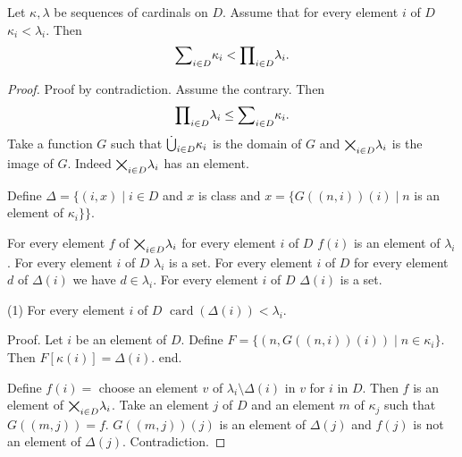 \documentclass{article}
\newcommand{\val}[2]{#1_{#2}}
\newcommand{\card}[1]{\operatorname{card}(#1)}
\begin{document}
\begin{forthel}
    \begin{theorem}
      Let $\kappa, \lambda$ be sequences of cardinals on $D$.
     Assume that for every element $i$ of $D$
     $\val{\kappa}{i} < \val{\lambda}{i}$.
     Then $$\Sum{\kappa}{D} < \Prod{\lambda}{D}.$$
    \end{theorem}
    \begin{proof}
      Proof by contradiction. Assume the contrary.
      Then $$\Prod{\lambda}{D} \leq \Sum{\kappa}{D}.$$
      Take a function $G$ such that $\SumSet{\kappa}{D}$ is the domain of $G$
      and $\ProdSet{\lambda}{D}$ is the image of $G$.
      Indeed $\ProdSet{\lambda}{D}$ has an element.

      Define $\Delta = \{ (i, x) \mid i \in D$ and $x$ is class and
        $x = \{ G((n,i))(i) \mid n$ is an element of $\val{\kappa}{i}\} \}$.

      For every element $f$ of $\ProdSet{\lambda}{D}$
      for every element $i$ of $D$
      $f(i)$ is an element of $\val{\lambda}{i}$.
      For every element $i$ of $D$ $\val{\lambda}{i}$ is a set.
      For every element $i$ of $D$ for every element $d$ of $\Delta(i)$
      we have $d\in \val{\lambda}{i}$.
      For every element $i$ of $D$ $\Delta(i)$ is a set.

     (1) For every element $i$ of $D$
      $\card{\Delta(i)} < \val{\lambda}{i}$.

      Proof.
        Let $i$ be an element of $D$.
        Define $F = \{ (n, G((n,i))(i)) \mid n \in \val{\kappa}{i} \}$.
        Then $F[\kappa(i)] = \Delta(i)$.
      end.

      Define
      $f(i) =$ choose an element $v$ of
      $\val{\lambda}{i} \setminus \Delta(i)$ in
      $v$ for $i$ in $D$. Then $f$ is an element of
      $\ProdSet{\lambda}{D}$. Take an element $j$ of $D$ and an
      element $m$ of $\val{\kappa}{j}$ such that $G((m,j)) = f$.
      $G((m,j))(j)$ is an element of $\Delta(j)$ and $f(j)$
      is not an element of $\Delta(j)$. Contradiction.
    \end{proof}
  \end{forthel}
\end{document}

